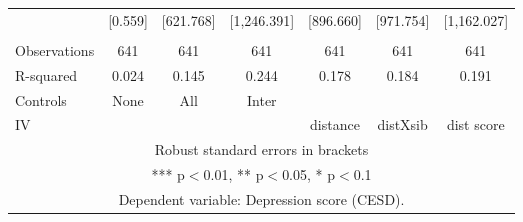 \begin{tabular}{lcccccc}
 & [0.559] & [621.768] & [1,246.391] & [896.660] & [971.754] & [1,162.027] \\
 &  &  &  &  &  &  \\
Observations & 641 & 641 & 641 & 641 & 641 & 641 \\
R-squared & 0.024 & 0.145 & 0.244 & 0.178 & 0.184 & 0.191 \\
Controls & None & All & Inter &  &  &  \\
 IV &  &  &  & distance & distXsib & dist score \\ \hline
\multicolumn{7}{c}{ Robust standard errors in brackets} \\
\multicolumn{7}{c}{ *** p$<$0.01, ** p$<$0.05, * p$<$0.1} \\
\multicolumn{7}{c}{ Dependent variable: Depression score (CESD).} \\
\end{tabular}
